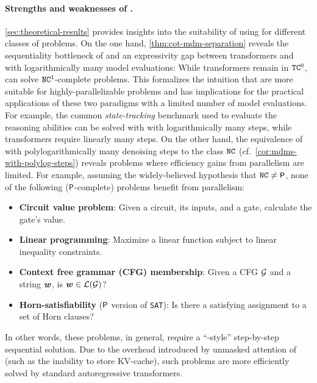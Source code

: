 \documentclass{article} %
\begin{document}
\paragraph{Strengths and weaknesses of \MDMsAcr.}
\cref{sec:theoretical-results} provides insights into the suitability of using \MDMsAcr for different classes of problems.
On the one hand, \cref{thm:cot-mdm-separation} reveals the sequentiality bottleneck of \CoTAcr and an expressivity gap between \CoTAcr transformers and \MDMsAcr with logarithmically many model evaluations: While \CoTAcr transformers remain in ${{{{{{\mathtt{TC}}}^{\mathtt{0}}}}}}$, \MDMsAcr can solve ${{{{{{\mathtt{NC}}}^{\mathtt{1}}}}}}$-complete problems.
This formalizes the intuition that \MDMsAcr are more suitable for highly-parallelizable problems and has implications for the practical applications of these two paradigms with a limited number of model evaluations.
For example, the common \emph{state-tracking} benchmark used to evaluate the reasoning abilities \citep{liu2023transformers,10.5555/3692070.3693514} can be solved with \MDMsAcr with logarithmically many steps, while \CoTAcr transformers require linearly many steps.
On the other hand, the equivalence of \MDMsAcr with polylogarithmically many denoising steps to the class ${{\mathtt{NC}}}$ (cf.~\cref{cor:mdms-with-polylog-steps}) reveals problems where efficiency gains from parallelism are limited.
For example, assuming the widely-believed hypothesis that ${{\mathtt{NC}}} \neq {{\textnormal{\textsf{\small P}}}}$, none of the following (${{\textnormal{\textsf{\small P}}}}$-complete) problems benefit from \MDMAcr parallelism:
\begin{itemize}[noitemsep,topsep=0pt,leftmargin=10pt]
   \item \textbf{Circuit value problem}: Given a circuit, its inputs, and a gate, calculate the gate's value.
   \item \textbf{Linear programming}: Maximize a linear function subject to linear inequality constraints.
   \item \textbf{Context free grammar (CFG) membership}: Given a CFG ${{\mathcal{G}}}$ and a string ${{\boldsymbol{w}}}$, is ${{\boldsymbol{w}}} \in {\mathcal{L}}({{\mathcal{G}}})$?
   \item \textbf{Horn-satisfiability} (${{\textnormal{\textsf{\small P}}}}$ version of \texttt{SAT}): Is there a satisfying assignment to a set of Horn clauses?
\end{itemize}
In other words, these problems, in general, require a ``\CoTAcr-style'' step-by-step sequential solution. 
Due to the overhead introduced by unmasked attention of \MDMsAcr (such as the inability to store KV-cache), such problems are more efficiently solved by standard autoregressive \CoTAcr transformers.
\end{document}
